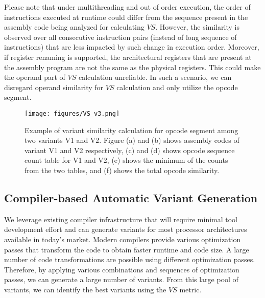 \documentclass[conference]{IEEEtran}
\begin{document}

Please note that under multithreading and out of order execution, the order of instructions executed at runtime could differ from the sequence present in the assembly code being analyzed for calculating $VS$. However, the similarity is observed over all consecutive instruction pairs (instead of long sequence of instructions) that are less impacted by such change in execution order. 
Moreover, if register renaming is supported, the architectural registers that are present at the assembly program are not the same as the physical registers. This could make the operand part of $VS$ calculation unreliable. In such a scenario, we can disregard operand similarity for $VS$ calculation and only utilize the opcode segment.






\begin{figure}[t!]
\centerline{\texttt{[image: figures/VS\_v3.png]}}
\caption{Example of variant similarity calculation for opcode segment among two variants V1 and V2. Figure (a) and (b) shows assembly codes of  variant V1 and V2 respectively, (c) and (d) shows  opcode sequence count table for V1 and V2, (e) shows the minimum of the counts from the two tables, and (f) shows the total opcode similarity.  }
\label{fig:vs}
\end{figure}



\subsection{Compiler-based Automatic Variant Generation}
We leverage existing compiler infrastructure that will require minimal tool development effort and can generate variants for most processor architectures available in today's market.  Modern compilers provide various optimization passes that transform the code to obtain faster runtime and code size. A large number of code transformations are possible using different optimization passes. Therefore, by applying various combinations and sequences of optimization passes, we can generate a large number of variants. From this large pool of variants, we can identify the best variants using the $VS$ metric.   
\end{document}
